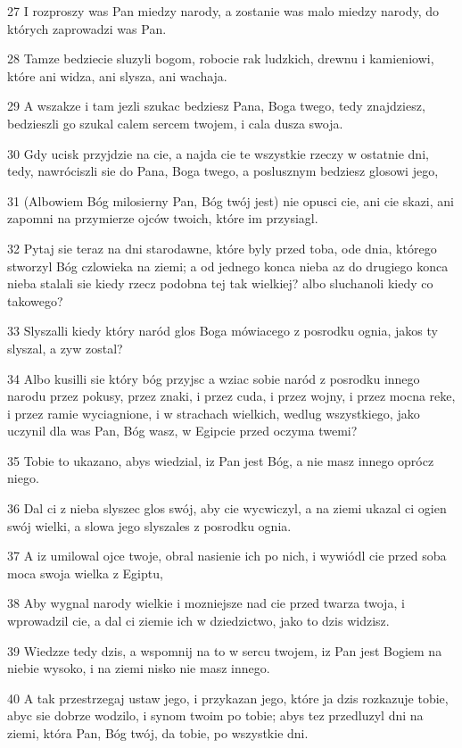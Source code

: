 \par 27 I rozproszy was Pan miedzy narody, a zostanie was malo miedzy narody, do których zaprowadzi was Pan.
\par 28 Tamze bedziecie sluzyli bogom, robocie rak ludzkich, drewnu i kamieniowi, które ani widza, ani slysza, ani wachaja.
\par 29 A wszakze i tam jezli szukac bedziesz Pana, Boga twego, tedy znajdziesz, bedzieszli go szukal calem sercem twojem, i cala dusza swoja.
\par 30 Gdy ucisk przyjdzie na cie, a najda cie te wszystkie rzeczy w ostatnie dni, tedy, nawróciszli sie do Pana, Boga twego, a poslusznym bedziesz glosowi jego,
\par 31 (Albowiem Bóg milosierny Pan, Bóg twój jest) nie opusci cie, ani cie skazi, ani zapomni na przymierze ojców twoich, które im przysiagl.
\par 32 Pytaj sie teraz na dni starodawne, które byly przed toba, ode dnia, którego stworzyl Bóg czlowieka na ziemi; a od jednego konca nieba az do drugiego konca nieba stalali sie kiedy rzecz podobna tej tak wielkiej? albo sluchanoli kiedy co takowego?
\par 33 Slyszalli kiedy który naród glos Boga mówiacego z posrodku ognia, jakos ty slyszal, a zyw zostal?
\par 34 Albo kusilli sie który bóg przyjsc a wziac sobie naród z posrodku innego narodu przez pokusy, przez znaki, i przez cuda, i przez wojny, i przez mocna reke, i przez ramie wyciagnione, i w strachach wielkich, wedlug wszystkiego, jako uczynil dla was Pan, Bóg wasz, w Egipcie przed oczyma twemi?
\par 35 Tobie to ukazano, abys wiedzial, iz Pan jest Bóg, a nie masz innego oprócz niego.
\par 36 Dal ci z nieba slyszec glos swój, aby cie wycwiczyl, a na ziemi ukazal ci ogien swój wielki, a slowa jego slyszales z posrodku ognia.
\par 37 A iz umilowal ojce twoje, obral nasienie ich po nich, i wywiódl cie przed soba moca swoja wielka z Egiptu,
\par 38 Aby wygnal narody wielkie i mozniejsze nad cie przed twarza twoja, i wprowadzil cie, a dal ci ziemie ich w dziedzictwo, jako to dzis widzisz.
\par 39 Wiedzze tedy dzis, a wspomnij na to w sercu twojem, iz Pan jest Bogiem na niebie wysoko, i na ziemi nisko nie masz innego.
\par 40 A tak przestrzegaj ustaw jego, i przykazan jego, które ja dzis rozkazuje tobie, abyc sie dobrze wodzilo, i synom twoim po tobie; abys tez przedluzyl dni na ziemi, która Pan, Bóg twój, da tobie, po wszystkie dni.
